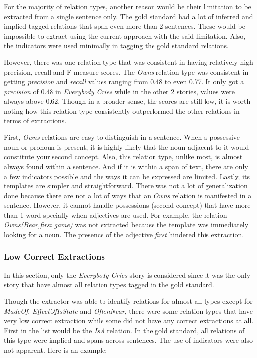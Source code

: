 For the majority of relation types, another reason would be their limitation to be extracted from a single sentence only. The gold standard had a lot of inferred and implied tagged relations that span even more than 2 sentences. These would be impossible to extract using the current approach with the said limitation. Also, the indicators were used minimally in tagging the gold standard relations.

However, there was one relation type that was consistent in having relatively high precision, recall and F-measure scores. The \textit{Owns} relation type was consistent in getting \textit{precision} and \textit{recall} values ranging from 0.48 to even 0.77. It only got a \textit{precision} of 0.48 in \textit{Everybody Cries} while in the other 2 stories, values were always above 0.62. Though in a broader sense, the scores are still low, it is worth noting how this relation type consistently outperformed the other relations in terms of extractions. 

First, \textit{Owns} relations are easy to distinguish in a sentence. When a possessive noun or pronoun is present, it is highly likely that the noun adjacent to it would constitute your second concept. Also, this relation type, unlike most, is almost always found within a sentence. And if it is within a span of text, there are only a few indicators possible and the ways it can be expressed are limited. Lastly, its templates are simpler and straightforward. There was not a lot of generalization done because there are not a lot of ways that an \textit{Owns} relation is manifested in a sentence. However, it cannot handle possessions (second concept) that have more than 1 word specially when adjectives are used. For example, the relation \textit{Owns(Bear,first game)} was not extracted because the template was immediately looking for a noun. The presence of the adjective \textit{first} hindered this extraction.  

\subsubsection*{Low Correct Extractions}

In this section, only the \textit{Everybody Cries} story is considered since it was the only story that have almost all relation types tagged in the gold standard. 

Though the extractor was able to identify relations for almost all types except for \textit{MadeOf}, \textit{EffectOfIsState} and \textit{OftenNear}, there were some relation types that have very low correct extraction while some did not have any correct extractions at all. First in the list would be the \textit{IsA} relation. In the gold standard, all relations of this type were implied and spans across sentences. The use of indicators were also not apparent. Here is an example:

